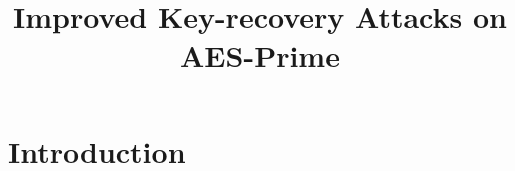 \documentclass[default]{sn-jnl}
\begin{document}
\title{Improved Key-recovery Attacks on AES-Prime}
\author*[3]{ } 


\abstract{
}
\keywords{}
\maketitle

\section{Introduction}

\let\Section\section
\def\section*#1{\Section*{#1}
  \phantomsection
  \addcontentsline{toc}{section}{References}}

\newcommand{\noop}[1]{}
\def\optional#1{#1}





\let\section\Section
\normalsize
\end{document}

